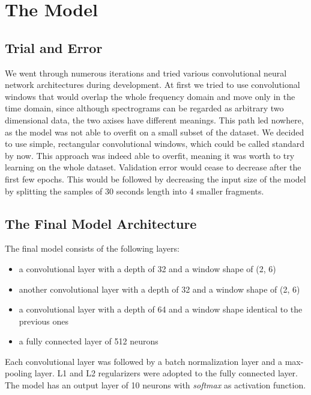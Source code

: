 \documentclass{article}
\begin{document}
    \section{The Model}

    \subsection{Trial and Error}

    We went through numerous iterations and tried various convolutional neural
    network architectures during development. At first we tried to use convolutional
    windows that would overlap the whole frequency domain and move only in the time domain,
    since although spectrograms can be regarded as arbitrary two dimensional data, the two
    axises have different meanings. This path led nowhere, as the model was not able to
    overfit on a small subset of the dataset. We decided to use simple, rectangular convolutional
    windows, which could be called standard by now. This approach was indeed able to overfit, meaning
    it was worth to try learning on the whole dataset. Validation error would cease to decrease
    after the first few epochs. This would be followed by decreasing the input size of the model
    by splitting the samples of 30 seconds length into 4 smaller fragments.

    \subsection{The Final Model Architecture}

    The final model consists of the following layers:

    \begin{itemize}
        \item a convolutional layer with a depth of 32 and a window shape of (2, 6)
        \item another convolutional layer with a depth of 32 and a window shape of (2, 6)
        \item a convolutional layer with a depth of 64 and a window shape identical to the previous ones
        \item a fully connected layer of 512 neurons
    \end{itemize}

    Each convolutional layer was followed by a batch normalization
    layer and a max-pooling layer. L1 and L2 regularizers were adopted to the fully connected layer.
    The model has an output layer of 10 neurons with \emph{softmax} as activation function.
\end{document}

